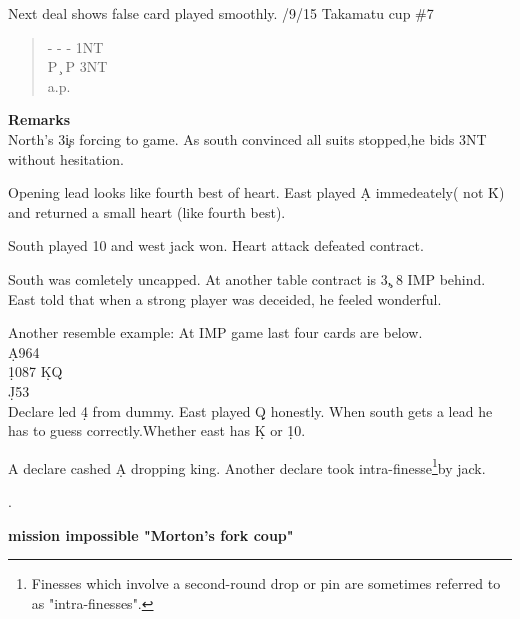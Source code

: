 Next deal shows false card played smoothly.
\vspace{0.5cm}
/9/15 Takamatu cup \#7
\begin{quote}
%
  {}%
  {}%
  {}%
  {}%
\end{quote}
\begin{quote}
\begin{bidding}
- \> -  \> -\> 1NT  \\
P \c \> P \> 3NT \\
a.p.
\end{bidding}
 \end{quote}
{\bf Remarks}\\
North's 3\c is forcing to game. As south convinced all
suits stopped,he bids 3NT without hesitation.

Opening lead looks like fourth best of heart.
East played \d A immedeately( not \h K) and returned
a small heart (like fourth best).

South played 10 and west jack won. Heart attack defeated
contract.

South was comletely uncapped. At another table contract
is 3\c , 8 IMP behind.
East told that when a strong player was deceided, he
feeled wonderful.

Another resemble example:
At IMP game last four cards are below.\\
\qquad \qquad \d A964\\
\qquad \d 1087 \qquad \d KQ\\
\qquad \qquad \d J53\\

Declare led \d 4 from dummy. East played \d Q honestly.
When south gets a lead he has to guess correctly.Whether east has 
\d K or \d 10.

A declare cashed \d A dropping king. Another
declare took intra-finesse\footnote{
Finesses which involve a second-round drop or pin are sometimes referred to as "intra-finesses".}by jack.

 .
\vspace {0.5cm}

{\bf mission impossible "Morton's fork coup"}\\

